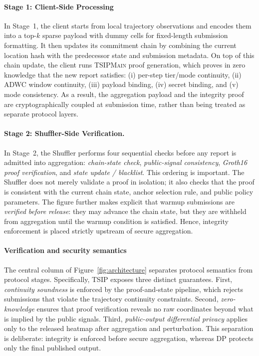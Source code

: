 \documentclass[conference]{IEEEtran}
\theoremstyle{definition}
\theoremstyle{plain}
\begin{document}
\paragraph{Stage 1: Client-Side Processing}
In Stage~1, the client starts from local trajectory observations and
encodes them into a top-$k$ sparse payload with dummy cells for
fixed-length submission formatting.
It then updates its commitment chain by combining the current location
hash with the predecessor state and submission metadata.
On top of this chain update, the client runs \textsc{TSIPMain} proof
generation, which proves in zero knowledge that the new report satisfies:
(i) per-step tier/mode continuity,
(ii) ADWC window continuity,
(iii) payload binding,
(iv) secret binding, and
(v) mode consistency.
As a result, the aggregation payload and the integrity proof are
cryptographically coupled at submission time, rather than being treated
as separate protocol layers.

\paragraph{Stage 2: Shuffler-Side Verification.}
In Stage~2, the Shuffler performs four sequential checks before any
report is admitted into aggregation:
\emph{chain-state check},
\emph{public-signal consistency},
\emph{Groth16 proof verification}, and
\emph{state update / blacklist}.
This ordering is important.
The Shuffler does not merely validate a proof in isolation; it also
checks that the proof is consistent with the current chain state,
anchor selection rule, and public policy parameters.
The figure further makes explicit that warmup submissions are
\emph{verified before release}: they may advance the chain state, but
they are withheld from aggregation until the warmup condition is
satisfied.
Hence, integrity enforcement is placed strictly upstream of secure
aggregation.

\paragraph{Verification and security semantics}
The central column of Figure~\ref{fig:architecture} separates protocol
semantics from protocol stages.
Specifically, \textsc{TSIP} exposes three distinct guarantees.
First, \emph{continuity soundness} is enforced by the proof-and-state
pipeline, which rejects submissions that violate the trajectory
continuity constraints.
Second, \emph{zero-knowledge} ensures that proof verification reveals
no raw coordinates beyond what is implied by the public signals.
Third, \emph{public-output differential privacy} applies only to the
released heatmap after aggregation and perturbation.
This separation is deliberate: integrity is enforced before secure
aggregation, whereas DP protects only the final published output.
\end{document}
